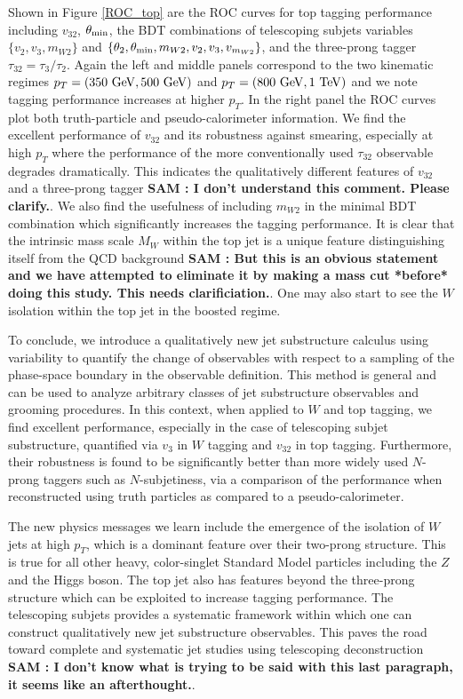 \documentclass[aps,prl,floatfix,preprintnumbers,twocolumn,groupedaddress,nofootinbib]{revtex4-1}
\begin{document}
Shown in Figure \ref{ROC_top} are the ROC curves for top tagging performance including $v_{32}$, $\theta_{\rm min}$, the BDT combinations of telescoping subjets variables $\{v_2, v_3, m_{W2}\}$ and $\{\theta_2,\theta_{\rm min},m_{W2},v_2,v_3,v_{m_{W2}}\}$, and the three-prong tagger $\tau_{32}=\tau_{3}/\tau_{2}$. Again the left and middle panels correspond to the two kinematic regimes $p_T=(350~{\rm GeV}, 500~{\rm GeV})$ and $p_T=(800~{\rm GeV}, 1~{\rm TeV})$ and we note tagging performance increases at higher $p_T$. In the right panel the ROC curves plot both truth-particle and pseudo-calorimeter information. We find the excellent performance of $v_{32}$ and its robustness against smearing, especially at high $p_T$ where the performance of the more conventionally used $\tau_{32}$ observable degrades dramatically. This indicates the qualitatively different features of $v_{32}$ and a three-prong tagger\textbf{\color{blue} SAM : I don't understand this comment. Please clarify.}. We also find the usefulness of including $m_{W2}$ in the minimal BDT combination which significantly increases the tagging performance. It is clear that the intrinsic mass scale $M_W$ within the top jet is a unique feature distinguishing itself from the QCD background\textbf{\color{blue} SAM : But this is an obvious statement and we have attempted to eliminate it by making a mass cut *before* doing this study. This needs clarificiation.}. One may also start to see the $W$ isolation within the top jet in the boosted regime.

To conclude, we introduce a qualitatively new jet substructure calculus using variability to quantify the change of observables with respect to a sampling of the phase-space boundary in the observable definition. This method is general and can be used to analyze arbitrary classes of jet substructure observables and grooming procedures. In this context, when applied to $W$ and top tagging, we find excellent performance, especially in the case of telescoping subjet substructure, quantified via $v_3$ in $W$ tagging and $v_{32}$ in top tagging. Furthermore, their robustness is found to be significantly better than more widely used $N$-prong taggers such as $N$-subjetiness, via a comparison of the performance when reconstructed using truth particles as compared to a pseudo-calorimeter. 

The new physics messages we learn include the emergence of the isolation of $W$ jets at high $p_T$, which is a dominant feature over their two-prong structure. This is true for all other heavy, color-singlet Standard Model particles including the $Z$ and the Higgs boson. The top jet also has features beyond the three-prong structure which can be exploited to increase tagging performance. The telescoping subjets provides a systematic framework within which one can construct qualitatively new jet substructure observables. This paves the road toward complete and systematic jet studies using telescoping deconstruction \cite{Chien:2017decon} \textbf{\color{blue} SAM : I don't know what is trying to be said with this last paragraph, it seems like an afterthought.}.
\end{document}
